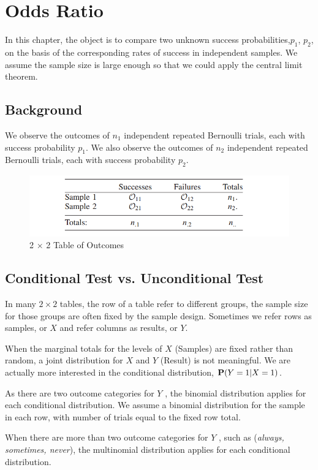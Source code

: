\section{Odds Ratio}
In this chapter, the object is to compare two unknown success probabilities,$p_1$, $p_2$, on the basis of the corresponding rates of success in independent samples. We assume the sample size is large enough so that we could apply the central limit theorem.

\subsection{Background}
We observe the outcomes of $n_1$ independent repeated Bernoulli trials, each with success probability $p_1$. We also observe the outcomes of $n_2$ independent repeated Bernoulli trials, each with success probability $p_2$.

\begin{figure}[H]
	\centering
	\includegraphics[width=0.7\linewidth]{fig/2x2-table}
	\caption{2 $\times$ 2 Table of Outcomes}
	\label{fig:2x2-table}
\end{figure}

\subsection{Conditional Test vs. Unconditional Test}

In many $2 \times 2$ tables, the row of a table refer to different groups, the sample size for those groups are often fixed by the sample design. Sometimes we refer rows as samples, or $X$ and refer columns as results, or $Y$.

When the marginal totals for the levels of $X$ (Samples) are fixed rather than random, a joint distribution for $X$ and $Y$ (Result) is not meaningful. We are actually more interested in the conditional distribution, $\P(Y=1|X=1)$.

As there are two outcome categories for $Y$ , the binomial
distribution applies for each conditional distribution. We assume
a binomial distribution for the sample in each row, with number
of trials equal to the fixed row total.

When there are more than two outcome categories for $Y$ , such
as (\textit{always, sometimes, never}), the multinomial distribution
applies for each conditional distribution.

